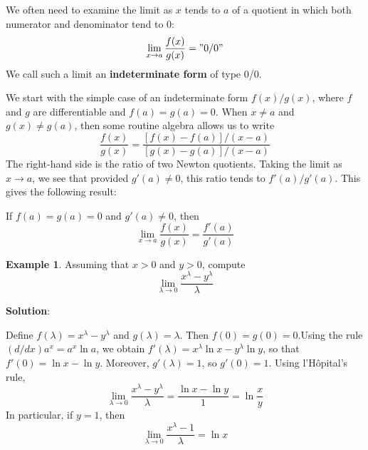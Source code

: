 \documentclass[10pt,a4paper]{book}
\theoremstyle{definition}\newtheorem{definition}{Definition}
\theoremstyle{definition}\newtheorem{fact}{Fact}
\theoremstyle{definition}\newtheorem{ex}{Ex.}
\theoremstyle{definition}\newtheorem{project}{Project}
\theoremstyle{definition}\newtheorem{problem}{Problem}
\theoremstyle{definition}\newtheorem{example}{Example}
\numberwithin{theorem}{chapter}
\numberwithin{corollary}{chapter}
\numberwithin{assumption}{chapter}
\numberwithin{definition}{chapter}
\numberwithin{prop}{chapter}
\numberwithin{notation}{chapter}
\numberwithin{problem}{chapter}
\numberwithin{example}{chapter}
\numberwithin{fact}{chapter}
\numberwithin{ex}{chapter}
\begin{document}
	We often need to examine the limit as $x$ tends to $a$ of a quotient in which both numerator and denominator tend to 0:
	$$\lim_{x \rightarrow a}\frac{f(x)}{g(x)}="0/0"$$
	We call such a limit an \textbf{indeterminate form} of type 0/0.
	
	We start with the simple case of an indeterminate form $f (x)/g(x)$, where $f$ and $g$ are differentiable and $f (a) = g(a) = 0$. When $x \neq a$ and $g(x) \neq g(a)$, then some routine algebra allows us to write
	$$\frac{f(x)}{g(x)}=\frac{[f(x)-f(a)]/(x-a)}{[g(x)-g(a)]/(x-a)}$$
	The right-hand side is the ratio of two Newton quotients. Taking the limit as $x \rightarrow a$, we see that provided $g'(a) \neq 0$, this ratio tends to $f'(a)/g'(a)$. This gives the following result:
	
	If $f(a) = g(a) = 0$ and $g'(a) \neq 0$, then
	$$\lim_{x \rightarrow a}\frac{f(x)}{g(x)} =\frac{f'(a)}{g'(a)}$$
	
	\begin{example}
		Assuming that $x>0$ and $y>0$, compute
		$$\lim_{\lambda \rightarrow 0} \frac{x^{\lambda}- y^{\lambda}}{\lambda}$$
		
		\textbf{Solution}:
		
		Define $f (\lambda) = x^{\lambda} - y^{\lambda}$ and $g(\lambda) = \lambda$. Then $f(0)=g(0)=0$.Using the rule $(d/dx)a^x =a^x\ln a$, we obtain $f'(\lambda)=x^{\lambda}\ln x - y^{\lambda}\ln y$, so that $f '(0) = \ln x - \ln y$. Moreover, $g'(\lambda) = 1$, so $g'(0) = 1$. Using l’Hôpital’s rule,
		$$\lim_{\lambda \rightarrow 0} \frac{x^{\lambda}- y^{\lambda}}{\lambda}=\frac{\ln x- \ln y}{1} = \ln \frac{x}{y}$$
		In particular, if $y=1$, then
		$$\lim_{\lambda \rightarrow 0}\frac{x^{\lambda}-1}{\lambda}=\ln x$$
	\end{example}
	
\end{document}
